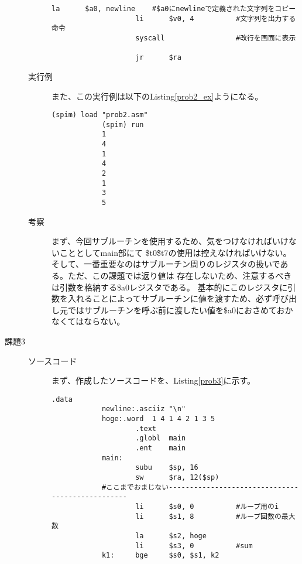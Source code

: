 \documentclass{jsarticle}
\begin{document}
\begin{description}
\begin{description}
\begin{lstlisting}[caption=課題2のソースコード, label=prob2]
                    la      $a0, newline    #$a0にnewlineで定義された文字列をコピー
                    li      $v0, 4          #文字列を出力する命令
                    syscall                 #改行を画面に表示

                    jr      $ra
            \end{lstlisting}

            \item[実行例]
            また、この実行例は以下のListing\ref{prob2_ex}ようになる。
            \begin{lstlisting}[caption=課題2の実行例, label=prob2_ex]
            (spim) load "prob2.asm"
            (spim) run
            1
            4
            1
            4
            2
            1
            3
            5
            \end{lstlisting}

            \item[考察]
            まず、今回サブルーチンを使用するため、気をつけなければいけないこととしてmain部にて
            \$t0\~\$t7の使用は控えなければいけない。
            そして、一番重要なのはサブルーチン周りのレジスタの扱いである。ただ、この課題では返り値は
            存在しないため、注意するべきは引数を格納する\$a0レジスタである。
            基本的にこのレジスタに引数を入れることによってサブルーチンに値を渡すため、必ず呼び出し元ではサブルーチンを呼ぶ前に渡したい値を\$a0におさめておかなくてはならない。
            \\
        \end{description}

        \item[課題3]
        \begin{description}
            \item[ソースコード]
            まず、作成したソースコードを、Listing\ref{prob3}に示す。
            \begin{lstlisting}[caption=課題3のソースコード, label=prob3]
                    .data
            newline:.asciiz "\n"
            hoge:.word  1 4 1 4 2 1 3 5
                    .text
                    .globl  main
                    .ent    main
            main:
                    subu    $sp, 16
                    sw      $ra, 12($sp)
            #ここまでおまじない-------------------------------------------------
                    li      $s0, 0          #ループ用のi
                    li      $s1, 8          #ループ回数の最大数
                    la      $s2, hoge
                    li      $s3, 0          #sum
            k1:     bge     $s0, $s1, k2


\end{lstlisting}
\end{description}
\end{description}
\end{document}
